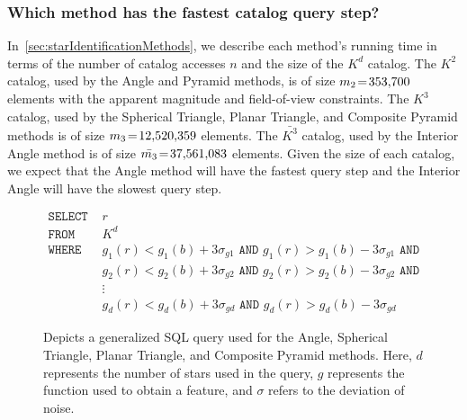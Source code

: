 \begin{table}
\end{table}

\subsubsection{Which method has the fastest catalog query step?}
In~\autoref{sec:starIdentificationMethods}, we describe each method's running time in terms of the number of catalog
accesses $n$ and the size of the $K^d$ catalog.
The $K^2$ catalog, used by the Angle and Pyramid methods, is of size $m_2 \!=\! 353{,}700$ elements with the apparent
magnitude and field-of-view constraints.
The $K^3$ catalog, used by the Spherical Triangle, Planar Triangle, and Composite Pyramid methods is of size
$m_3 \!=\! 12{,}520{,}359$ elements.
The $\bar{K^3}$ catalog, used by the Interior Angle method is of size $\bar{m_3} \!=\! 37{,}561{,}083$ elements.
Given the size of each catalog, we expect that the Angle method will have the fastest query step and the Interior Angle
will have the slowest query step.

\begin{figure}
    \begin{align*}
        \texttt{SELECT } &r \\
        \texttt{FROM } &K^d \\
        \texttt{WHERE } &g_1(r) < g_1(b) + 3\sigma_{g1} \texttt{ AND } g_1(r) > g_1(b) - 3\sigma_{g1} \texttt{ AND } \\
        &g_2(r) < g_2(b) + 3\sigma_{g2} \texttt{ AND } g_2(r) > g_2(b) - 3\sigma_{g2} \texttt{ AND } \\
        &\vdots \\
        &g_d(r) < g_d(b) + 3\sigma_{gd} \texttt{ AND } g_d(r) > g_d(b) - 3\sigma_{gd}
    \end{align*}
     \caption{
     Depicts a generalized SQL query used for the Angle, Spherical Triangle, Planar Triangle, and Composite Pyramid
     methods.
     Here, $d$ represents the number of stars used in the query, $g$ represents the function used to obtain a feature,
     and $\sigma$ refers to the deviation of noise.
     }\label{fig:sqlQuery}
\end{figure}

